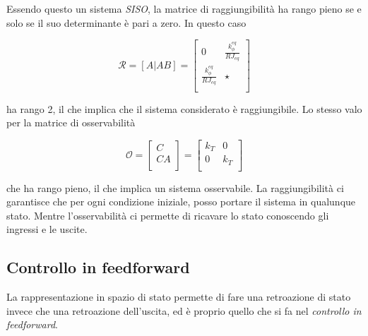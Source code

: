 \documentclass[english]{article}
\begin{document}
		\noindent Essendo questo un sistema \textit{SISO}, la matrice di raggiungibilità ha rango pieno se e solo se il suo determinante è pari a zero. In questo caso
		
		\begin{equation}
			\mathcal{R}=[A|AB]=
			\begin{bmatrix}
				0 & \frac{k_{\phi}^{eq}}{RJ_{eq}} \\
				\frac{k_{\phi}^{eq}}{RJ_{eq}} & \star \\
			\end{bmatrix}
		\end{equation}
		
		\noindent ha rango 2, il che implica che il sistema considerato è raggiungibile. Lo stesso valo per la matrice di osservabilità
		
		\begin{equation}
			\mathcal{O}=
			\left[
			\begin{array}{cc}
				C  \\ \hline
				CA \\
			\end{array}
			\right]
			=
			\begin{bmatrix}
				k_T & 0   \\
				0   & k_T \\
			\end{bmatrix}
		\end{equation} 
		
		\noindent che ha rango pieno, il  che implica un sistema osservabile. La raggiungibilità ci garantisce che per ogni condizione iniziale, posso portare il sistema in qualunque stato. Mentre l'osservabilità ci permette di ricavare lo stato conoscendo gli ingressi e le uscite.
		
	\subsection{Controllo in feedforward}
	\label{sub:feedforward}
		
		La rappresentazione in spazio di stato permette di fare una retroazione di stato invece che una retroazione dell'uscita, ed è proprio quello che si fa nel \textit{controllo in feedforward}. 
		
\end{document}
